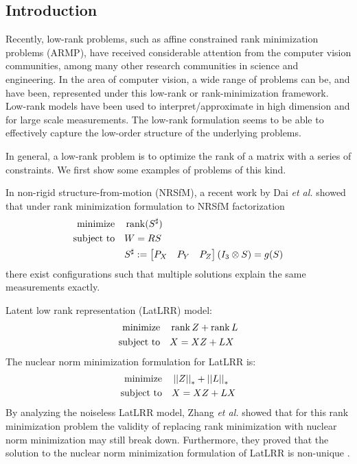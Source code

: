 \documentclass[11pt]{article}
\begin{document}
\subsection{Introduction}

Recently, low-rank problems, such as affine constrained rank minimization problems (ARMP), have received considerable attention from the computer vision communities, among many other research communities in science and engineering. In the area of computer vision, a wide range of problems can be, and have been, represented under this low-rank or rank-minimization framework. Low-rank models have been used to interpret/approximate in high dimension and for large scale measurements. The low-rank formulation seems to be able to effectively capture the low-order structure of the underlying problems.

In general, a low-rank problem is to optimize the rank of a matrix with a series of constraints. We first show some examples of problems of this kind.

\begin{example}
    In non-rigid structure-from-motion (NRSfM), a recent work by Dai \emph{et al.} \cite{dai2014simple} showed that under rank minimization formulation to NRSfM factorization
    \[\begin{aligned}
        \textnormal{minimize}\quad & \operatorname{rank}(S^{\sharp})\\
        \textnormal{subject to}\quad & W=RS\\
        & S^{\sharp}:=\begin{bmatrix}P_X & P_Y & P_Z\end{bmatrix}\left(I_3\otimes S\right)=g(S)
    \end{aligned}\]
    there exist configurations such that multiple solutions explain the same measurements exactly.
\end{example}

\begin{example}\label{eg:latlrr}
    Latent low rank representation (LatLRR) model:
    \[\begin{aligned}
        \textnormal{minimize}\quad & \operatorname{rank} Z+\operatorname{rank} L\\
        \textnormal{subject to}\quad & X=XZ+LX
    \end{aligned}\]
    The nuclear norm minimization formulation for LatLRR is:
    \[\begin{aligned}
        \textnormal{minimize}\quad & \left|\left|Z\right|\right|_\ast+\left|\left|L\right|\right|_\ast\\
        \textnormal{subject to}\quad & X=XZ+LX
    \end{aligned}\]
    By analyzing the noiseless LatLRR model, Zhang \emph{et al.} \cite{zhang2013counterexample} showed that for this rank minimization problem the validity of replacing rank minimization with nuclear norm minimization may still break down. Furthermore, they proved that the solution to the nuclear norm minimization formulation of LatLRR is non-unique \cite{dai2014rank}.
\end{example}
\end{document}
